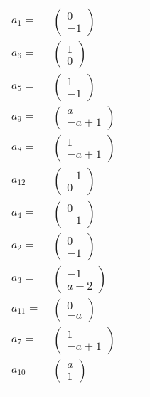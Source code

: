 \documentclass[1p]{elsarticle_modified}
\theoremstyle{definition}
\begin{document}
\begin{tabular}{m{7pt} m{180pt} m{7pt} m{180pt} }
\flushright $a_{1}=$&$\begin{pmatrix}0\\-1\end{pmatrix}$ \\
\flushright $a_{6}=$&$\begin{pmatrix}1\\0\end{pmatrix}$ \\
\flushright $a_{5}=$&$\begin{pmatrix}1\\-1\end{pmatrix}$ \\
\flushright $a_{9}=$&$\begin{pmatrix}a\\- a+1\end{pmatrix}$ \\
\flushright $a_{8}=$&$\begin{pmatrix}1\\- a+1\end{pmatrix}$ \\
\flushright $a_{12}=$&$\begin{pmatrix}-1\\0\end{pmatrix}$ \\
\flushright $a_{4}=$&$\begin{pmatrix}0\\-1\end{pmatrix}$ \\
\flushright $a_{2}=$&$\begin{pmatrix}0\\-1\end{pmatrix}$ \\
\flushright $a_{3}=$&$\begin{pmatrix}-1\\a-2\end{pmatrix}$ \\
\flushright $a_{11}=$&$\begin{pmatrix}0\\- a\end{pmatrix}$ \\
\flushright $a_{7}=$&$\begin{pmatrix}1\\- a+1\end{pmatrix}$ \\
\flushright $a_{10}=$&$\begin{pmatrix}a\\1\end{pmatrix}$\\&\end{tabular}
\end{document}
